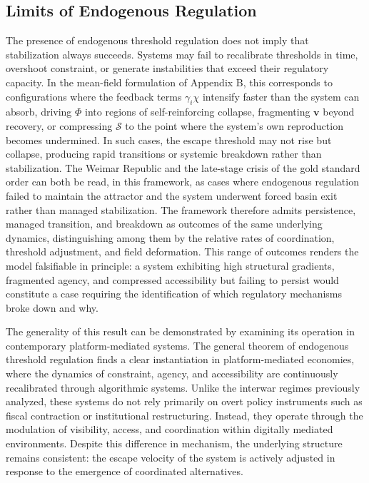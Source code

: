 \documentclass[11pt, a4paper]{article}
\begin{document}
\subsection{Limits of Endogenous Regulation}

The presence of endogenous threshold regulation does not imply that stabilization always succeeds. Systems may fail to recalibrate thresholds in time, overshoot constraint, or generate instabilities that exceed their regulatory capacity. In the mean-field formulation of Appendix B, this corresponds to configurations where the feedback terms $\gamma_i \chi$ intensify faster than the system can absorb, driving $\Phi$ into regions of self-reinforcing collapse, fragmenting $\mathbf{v}$ beyond recovery, or compressing $\mathcal{S}$ to the point where the system's own reproduction becomes undermined. In such cases, the escape threshold may not rise but collapse, producing rapid transitions or systemic breakdown rather than stabilization. The Weimar Republic and the late-stage crisis of the gold standard order can both be read, in this framework, as cases where endogenous regulation failed to maintain the attractor and the system underwent forced basin exit rather than managed stabilization. The framework therefore admits persistence, managed transition, and breakdown as outcomes of the same underlying dynamics, distinguishing among them by the relative rates of coordination, threshold adjustment, and field deformation. This range of outcomes renders the model falsifiable in principle: a system exhibiting high structural gradients, fragmented agency, and compressed accessibility but failing to persist would constitute a case requiring the identification of which regulatory mechanisms broke down and why.

The generality of this result can be demonstrated by examining its operation in contemporary platform-mediated systems. The general theorem of endogenous threshold regulation finds a clear instantiation in platform-mediated economies, where the dynamics of constraint, agency, and accessibility are continuously recalibrated through algorithmic systems. Unlike the interwar regimes previously analyzed, these systems do not rely primarily on overt policy instruments such as fiscal contraction or institutional restructuring. Instead, they operate through the modulation of visibility, access, and coordination within digitally mediated environments. Despite this difference in mechanism, the underlying structure remains consistent: the escape velocity of the system is actively adjusted in response to the emergence of coordinated alternatives.
\end{document}
